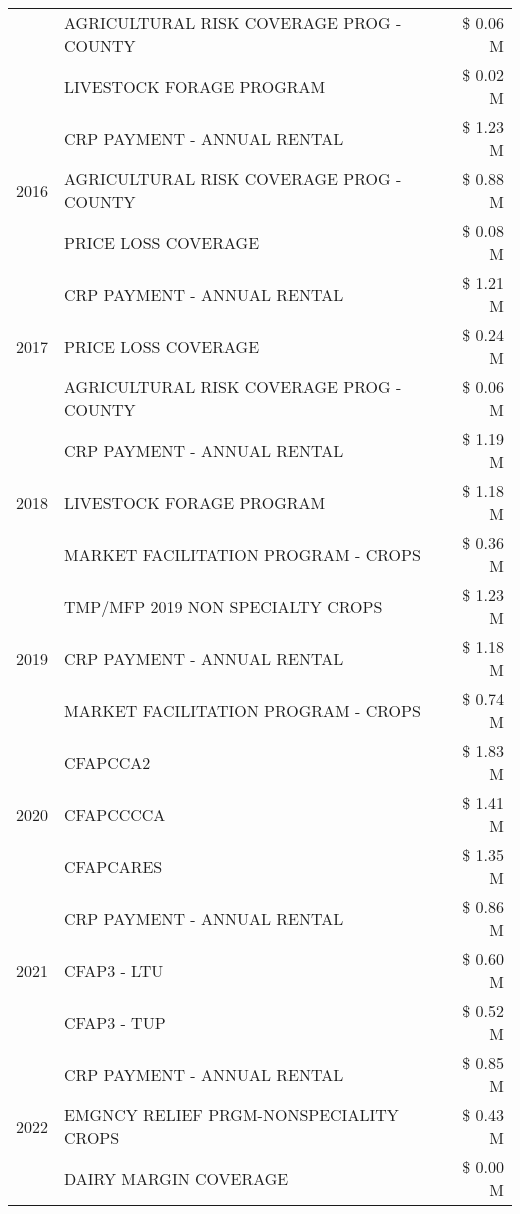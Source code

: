 \begin{tabular}{llr}
 & AGRICULTURAL RISK COVERAGE PROG - COUNTY & \$ 0.06 M \\
 & LIVESTOCK FORAGE PROGRAM & \$ 0.02 M \\
\cline{1-3}
\multirow[t]{3}{*}{2016} & CRP PAYMENT - ANNUAL RENTAL & \$ 1.23 M \\
 & AGRICULTURAL RISK COVERAGE PROG - COUNTY & \$ 0.88 M \\
 & PRICE LOSS COVERAGE & \$ 0.08 M \\
\cline{1-3}
\multirow[t]{3}{*}{2017} & CRP PAYMENT - ANNUAL RENTAL & \$ 1.21 M \\
 & PRICE LOSS COVERAGE & \$ 0.24 M \\
 & AGRICULTURAL RISK COVERAGE PROG - COUNTY & \$ 0.06 M \\
\cline{1-3}
\multirow[t]{3}{*}{2018} & CRP PAYMENT - ANNUAL RENTAL & \$ 1.19 M \\
 & LIVESTOCK FORAGE PROGRAM & \$ 1.18 M \\
 & MARKET FACILITATION PROGRAM - CROPS & \$ 0.36 M \\
\cline{1-3}
\multirow[t]{3}{*}{2019} & TMP/MFP 2019 NON SPECIALTY CROPS & \$ 1.23 M \\
 & CRP PAYMENT - ANNUAL RENTAL & \$ 1.18 M \\
 & MARKET FACILITATION PROGRAM - CROPS & \$ 0.74 M \\
\cline{1-3}
\multirow[t]{3}{*}{2020} & CFAPCCA2 & \$ 1.83 M \\
 & CFAPCCCCA & \$ 1.41 M \\
 & CFAPCARES & \$ 1.35 M \\
\cline{1-3}
\multirow[t]{3}{*}{2021} & CRP PAYMENT - ANNUAL RENTAL & \$ 0.86 M \\
 & CFAP3 - LTU & \$ 0.60 M \\
 & CFAP3 - TUP & \$ 0.52 M \\
\cline{1-3}
\multirow[t]{3}{*}{2022} & CRP PAYMENT - ANNUAL RENTAL & \$ 0.85 M \\
 & EMGNCY RELIEF PRGM-NONSPECIALITY CROPS & \$ 0.43 M \\
 & DAIRY MARGIN COVERAGE & \$ 0.00 M \\
\cline{1-3}
\bottomrule
\end{tabular}
